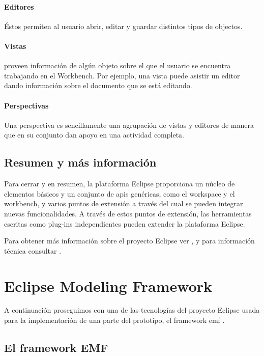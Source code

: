 \documentclass[a4paper,12pt,oneside,spanish]{book}
\begin{document}
\paragraph{Editores} Éstos permiten al usuario abrir, editar y guardar distintos tipos de objectos.

\paragraph{Vistas} proveen información de algún objeto sobre el que el usuario se encuentra trabajando en el Workbench. Por ejemplo, una vista puede asistir un editor dando información sobre el documento que se está editando.

\paragraph{Perspectivas} Una perspectiva es sencillamente una agrupación de vistas y editores de manera que en su conjunto dan apoyo en una actividad completa.


\subsection{Resumen y más información}

Para cerrar y en resumen, la plataforma Eclipse proporciona un núcleo de elementos básicos y un conjunto de \glspl{api} genéricas, como el workspace y el workbench, y varios puntos de extensión a través del cual se pueden integrar nuevas funcionalidades. A través de estos puntos de extensión, las herramientas escritas como plug-ins independientes pueden extender la plataforma Eclipse.

Para obtener más información sobre el proyecto Eclipse ver \cite[\url{www.eclipse.org}]{Eclipse}, y para información técnica consultar \cite[Eclipse Platform Technical Overview]{EclipseTech}.


\section{Eclipse Modeling Framework}

A continuación proseguimos con una de las tecnologías del proyecto Eclipse usada para la implementación de una parte del prototipo, el framework \gls{emf} \cite{EMF}.

\subsection{El framework EMF}
\end{document}
